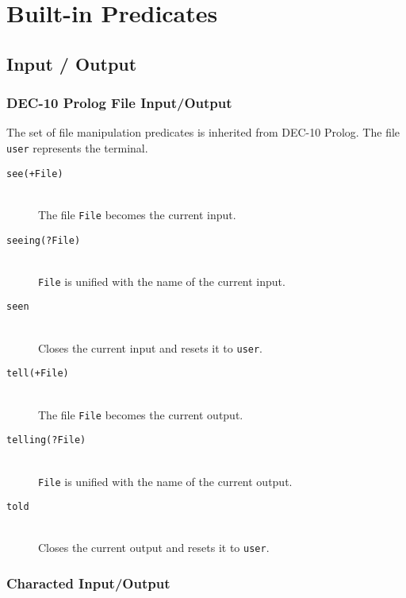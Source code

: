 \section{Built-in Predicates}

\subsection{Input / Output}



\subsubsection{DEC-10 Prolog File Input/Output}

The set of file manipulation predicates is inherited from DEC-10
Prolog. The file {\tt user} represents the terminal.

\begin{description}

\item [{\tt see(+File)}]~\\ 
	The file {\tt File} becomes the current input.

\item [{\tt seeing(?File)}]~\\ 
	{\tt File} is unified with the name of the current input.

\item [{\tt seen}]~\\ 
	Closes the current input and resets it to {\tt user}.

\item [{\tt tell(+File)}]~\\ 
	The file {\tt File} becomes the current output.

\item [{\tt telling(?File)}]~\\ 
	{\tt File} is unified with the name of the current output.

\item [{\tt told}]~\\ 
	Closes the current output and resets it to {\tt user}.

\end{description}

\subsubsection{Characted Input/Output}


